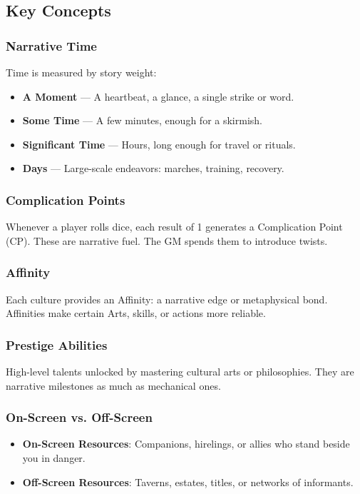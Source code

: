 \documentclass[11pt]{article}
\begin{document}
\subsection{Key Concepts}

\subsubsection{Narrative Time}
Time is measured by story weight:
\begin{itemize}
    \item \textbf{A Moment} — A heartbeat, a glance, a single strike or word.
    \item \textbf{Some Time} — A few minutes, enough for a skirmish.
    \item \textbf{Significant Time} — Hours, long enough for travel or rituals.
    \item \textbf{Days} — Large-scale endeavors: marches, training, recovery.
\end{itemize}

\subsubsection{Complication Points}
Whenever a player rolls dice, each result of 1 generates a Complication Point (CP). These are narrative fuel. The GM spends them to introduce twists.

\subsubsection{Affinity}
Each culture provides an Affinity: a narrative edge or metaphysical bond. Affinities make certain Arts, skills, or actions more reliable.

\subsubsection{Prestige Abilities}
High-level talents unlocked by mastering cultural arts or philosophies. They are narrative milestones as much as mechanical ones.

\subsubsection{On-Screen vs. Off-Screen}
\begin{itemize}
    \item \textbf{On-Screen Resources}: Companions, hirelings, or allies who stand beside you in danger.
    \item \textbf{Off-Screen Resources}: Taverns, estates, titles, or networks of informants.
\end{itemize}
\end{document}

